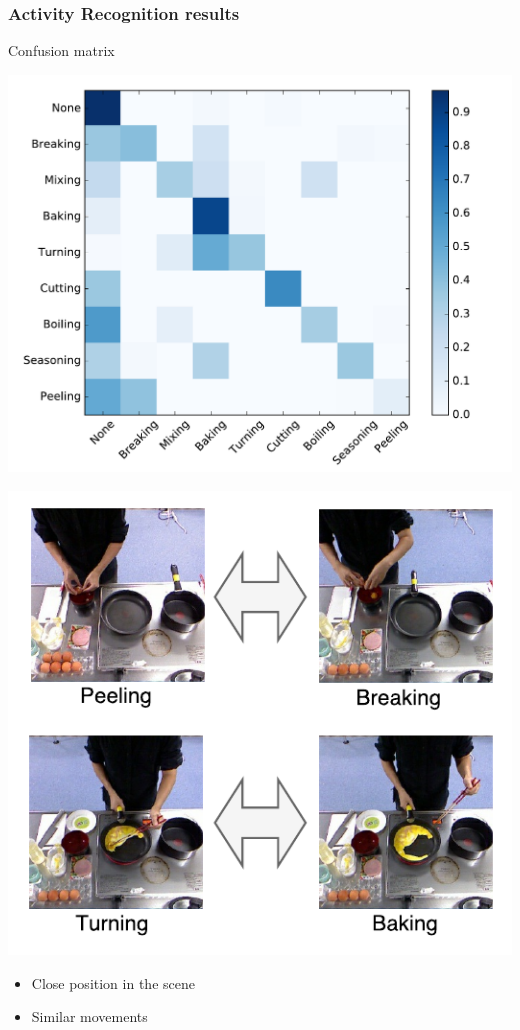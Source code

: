 \documentclass{beamer}
\begin{document}
\begin{frame}[c]\frametitle{Activity Recognition results}
	Confusion matrix
	
	\begin{minipage}{0.48\linewidth}
        \includegraphics[width=\linewidth]{fig/egg-confusion_matrix.pdf}
    \end{minipage}
    \begin{minipage}{0.48\linewidth}
        \includegraphics[width=0.8\linewidth]{fig/egg-cooking-similar.pdf}
    \end{minipage}
    \begin{itemize}
		\item Close position in the scene
        \item Similar movements
    \end{itemize}
\end{frame}
\end{document}
